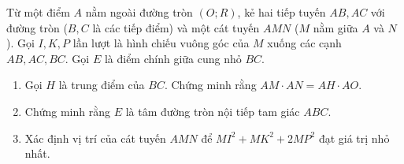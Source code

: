 \begin{ex}%
	Từ một điểm $A$ nằm ngoài đường tròn $(O;R)$, kẻ hai tiếp tuyến $AB,AC$ với đường tròn ($B,C$ là các tiếp điểm) và một cát tuyến $AMN$ ($M$ nằm giữa $A$ và $N$). Gọi $I,K,P$ lần lượt là hình chiếu vuông góc của $M$ xuống các cạnh $AB,AC,BC$. Gọi $E$ là điểm chính giữa cung nhỏ $BC$.
	\begin{enumerate}
		\item Gọi $H$ là trung điểm của $BC$. Chứng minh rằng $AM\cdot AN=AH\cdot AO$.
		\item Chứng minh rằng $E$ là tâm đường tròn nội tiếp tam giác $ABC$.
		\item Xác định vị trí của cát tuyến $AMN$ để $MI^2+MK^2+2MP^2$ đạt giá trị nhỏ nhất. 
	\end{enumerate}  
\end{ex}
